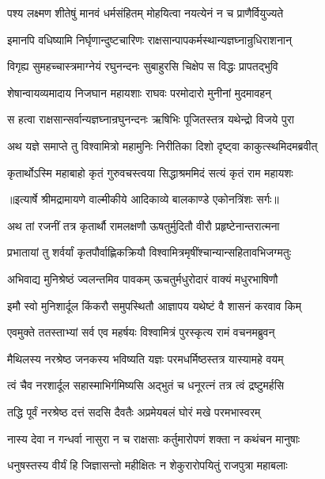 \twolineshloka
{पश्य लक्ष्मण शीतेषुं मानवं धर्मसंहितम्}
{मोहयित्वा नयत्येनं न च प्राणैर्वियुज्यते} %

\twolineshloka
{इमानपि वधिष्यामि निर्घृणान्दुष्टचारिणः}
{राक्षसान्पापकर्मस्थान्यज्ञघ्नान्रुधिराशनान्} %

\twolineshloka
{विगृह्य सुमहच्चास्त्रमाग्नेयं रघुनन्दनः}
{सुबाहुरसि चिक्षेप स विद्धः प्रापतद्भुवि} %

\twolineshloka
{शेषान्वायव्यमादाय निजघान महायशाः}
{राघवः परमोदारो मुनीनां मुदमावहन्} %

\twolineshloka
{स हत्वा राक्षसान्सर्वान्यज्ञघ्नान्रघुनन्दनः}
{ऋषिभिः पूजितस्तत्र यथेन्द्रो विजये पुरा} %

\twolineshloka
{अथ यज्ञे समाप्ते तु विश्वामित्रो महामुनिः}
{निरीतिका दिशो दृष्ट्वा काकुत्स्थमिदमब्रवीत्} %

\twolineshloka
{कृतार्थोऽस्मि महाबाहो कृतं गुरुवचस्त्वया}
{सिद्धाश्रममिदं सत्यं कृतं राम महायशः} %


{॥इत्यार्षे श्रीमद्रामायणे वाल्मीकीये आदिकाव्ये बालकाण्डे एकोनत्रिंशः सर्गः॥}


\twolineshloka
{अथ तां रजनीं तत्र कृतार्थौ रामलक्षणौ}
{ऊषतुर्मुदितौ वीरौ प्रहृष्टेनान्तरात्मना} %

\twolineshloka
{प्रभातायां तु शर्वर्यां कृतपौर्वाह्णिकक्रियौ}
{विश्वामित्रमृषींश्चान्यान्सहितावभिजग्मतुः} %

\twolineshloka
{अभिवाद्य मुनिश्रेष्ठं ज्वलन्तमिव पावकम्}
{ऊचतुर्मधुरोदारं वाक्यं मधुरभाषिणौ} %

\twolineshloka
{इमौ स्वो मुनिशार्दूल किंकरौ समुपस्थितौ}
{आज्ञापय यथेष्टं वै शासनं करवाव किम्} %

\twolineshloka
{एवमुक्ते ततस्ताभ्यां सर्व एव महर्षयः}
{विश्वामित्रं पुरस्कृत्य रामं वचनमब्रुवन्} %

\twolineshloka
{मैथिलस्य नरश्रेष्ठ जनकस्य भविष्यति}
{यज्ञः परमधर्मिष्ठस्तत्र यास्यामहे वयम्} %

\twolineshloka
{त्वं चैव नरशार्दूल सहास्माभिर्गमिष्यसि}
{अद्भुतं च धनूरत्नं तत्र त्वं द्रष्टुमर्हसि} %

\twolineshloka
{तद्धि पूर्वं नरश्रेष्ठ दत्तं सदसि दैवतैः}
{अप्रमेयबलं घोरं मखे परमभास्वरम्} %

\twolineshloka
{नास्य देवा न गन्धर्वा नासुरा न च राक्षसाः}
{कर्तुमारोपणं शक्ता न कथंचन मानुषाः} %

\twolineshloka
{धनुषस्तस्य वीर्यं हि जिज्ञासन्तो महीक्षितः}
{न शेकुरारोपयितुं राजपुत्रा महाबलाः} %

